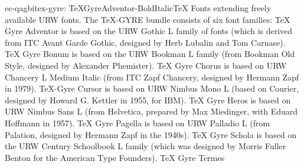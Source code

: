 \documentclass{ddltxtyp}
\begin{document}
\begin{package}{ec-qagbi}{tex-gyre: TeXGyreAdventor-BoldItalic}{{\TeX} Fonts extending freely available URW fonts.}
The {\TeX}-GYRE bundle consists of six font families: {\TeX} Gyre
Adventor is based on the URW Gothic L family of fonts (which is
derived from ITC Avant Garde Gothic, designed by Herb Lubalin
and Tom Carnase). {\TeX} Gyre Bonum is based on the URW Bookman L
family (from Bookman Old Style, designed by Alexander
Phemister). {\TeX} Gyre Chorus is based on URW Chancery L Medium
Italic (from ITC Zapf Chancery, designed by Hermann Zapf in
1979). {\TeX}-Gyre Cursor is based on URW Nimbus Mono L (based on
Courier, designed by Howard G. Kettler in 1955, for IBM). {\TeX}
Gyre Heros is based on URW Nimbus Sans L (from Helvetica,
prepared by Max Miedinger, with Eduard Hoffmann in 1957). {\TeX}
Gyre Pagella is based on URW Palladio L (from Palation,
designed by Hermann Zapf in the 1940s). {\TeX} Gyre Schola is
based on the URW Century Schoolbook L family (which was
designed by Morris Fuller Benton for the American Type
Founders). {\TeX} Gyre Termes %
\end{package}
\end{document}

